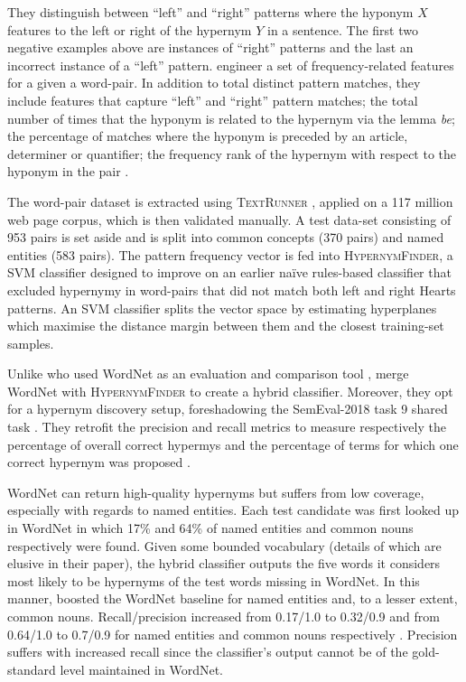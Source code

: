 They distinguish between “left” and “right” patterns where the hyponym $X$ features to the left or right of the hypernym $Y$ in a sentence.  The first two negative examples above are instances of “right” patterns and the last an incorrect instance of a “left” pattern.  \citeauthor{ritter2009anyway} engineer a set of frequency-related features for a given a word-pair.  In addition to total distinct pattern matches, they include features that capture “left” and “right” pattern matches; the total number of times that the hyponym is related to the hypernym via the lemma \textit{be}; the percentage of matches where the hyponym is preceded by an article, determiner or quantifier; the frequency rank of the hypernym with respect to the hyponym in the pair \citep{ritter2009anyway}.   

The word-pair dataset is extracted using \textsc{TextRunner} \citep{banko2007open}, applied on a 117 million web page corpus, which is then validated manually.  A test data-set consisting of 953 pairs is set aside and is split into common concepts (370 pairs) and named entities (583 pairs).  The pattern frequency vector is fed into \textsc{HypernymFinder}, a \ac{SVM} classifier \citep{platt1999probabilistic} designed to improve on an earlier na\"ive rules-based classifier that excluded hypernymy in word-pairs that did not match both left and right Hearts patterns.  An \ac{SVM} classifier splits the vector space by estimating hyperplanes which maximise the distance margin between them and the closest training-set samples.    

Unlike \citeauthor{Snow2004} who used WordNet as an evaluation and comparison tool \citep{Snow2004}, \citeauthor{ritter2009anyway} merge WordNet with \textsc{HypernymFinder} to create a hybrid classifier.  
Moreover, they opt for a hypernym discovery setup, foreshadowing the SemEval-2018 task 9 shared task \citep{camacho2018semeval}.  They retrofit the precision and recall metrics to measure respectively the percentage of overall correct hypermys and the percentage of terms for which one correct hypernym was proposed \citep{ritter2009anyway}.  

WordNet can return high-quality hypernyms but suffers from low coverage, especially with regards to named entities.  Each test candidate was first looked up in WordNet in which 17\% and 64\% of named entities and common nouns respectively were found.  Given some bounded vocabulary (details of which are elusive in their paper), the hybrid classifier outputs the five words it considers most likely to be hypernyms of the test words missing in WordNet.  In this manner, \citeauthor{ritter2009anyway} boosted the WordNet baseline for named entities and, to a lesser extent, common nouns.  Recall/precision increased from 0.17/1.0 to 0.32/0.9 and from 0.64/1.0 to 0.7/0.9 for named entities and common nouns respectively \citep{ritter2009anyway}.  Precision suffers with increased recall since the classifier’s output cannot be of the gold-standard level maintained in WordNet.

